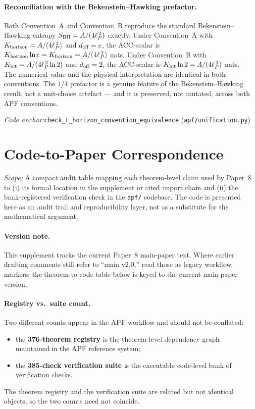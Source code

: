 \documentclass[11pt]{article}
\theoremstyle{plain}
\theoremstyle{definition}
\theoremstyle{remark}
\newcommand{\coderef}[2]{\par\noindent\textit{Code anchor:}\quad\texttt{#1} (\texttt{#2})}
\begin{document}
\paragraph{Reconciliation with the Bekenstein--Hawking prefactor.}  Both Convention~A and Convention~B reproduce the standard Bekenstein--Hawking entropy $S_{\rm BH} = A/(4\ell_P^{\,2})$ exactly.  Under Convention~A with $K_{\rm horizon} = A/(4\ell_P^{\,2})$ and $d_{\rm eff} = e$, the ACC-scalar is $K_{\rm horizon} \ln e = K_{\rm horizon} = A/(4\ell_P^{\,2})$ nats.  Under Convention~B with $K_{\rm bit} = A/(4\ell_P^{\,2} \ln 2)$ and $d_{\rm eff} = 2$, the ACC-scalar is $K_{\rm bit} \ln 2 = A/(4\ell_P^{\,2})$ nats.  The numerical value and the physical interpretation are identical in both conventions.  The $1/4$ prefactor is a genuine feature of the Bekenstein--Hawking result, not a unit-choice artefact --- and it is preserved, not mutated, across both APF conventions.

\coderef{check\_L\_horizon\_convention\_equivalence}{apf/unification.py}

\section{Code-to-Paper Correspondence}\label{supp:L}

\noindent\textit{Scope:} A compact audit table mapping each theorem-level claim used by Paper~8 to (i) its formal location in the supplement or cited import chain and (ii) the bank-registered verification check in the \texttt{apf/} codebase.  The code is presented here as an audit trail and reproducibility layer, not as a substitute for the mathematical argument.

\bigskip

\paragraph{Version note.}
This supplement tracks the current Paper~8 main-paper text.  Where earlier drafting comments still refer to ``main v2.0,'' read those as legacy workflow markers; the theorem-to-code table below is keyed to the current main-paper version.

\paragraph{Registry vs.\ suite count.}
Two different counts appear in the APF workflow and should not be conflated:
\begin{itemize}[leftmargin=2em,itemsep=2pt]
  \item the \textbf{376-theorem registry} is the theorem-level dependency graph maintained in the APF reference system;
  \item the \textbf{385-check verification suite} is the executable code-level bank of verification checks.
\end{itemize}
The theorem registry and the verification suite are related but not identical objects, so the two counts need not coincide.
\end{document}
